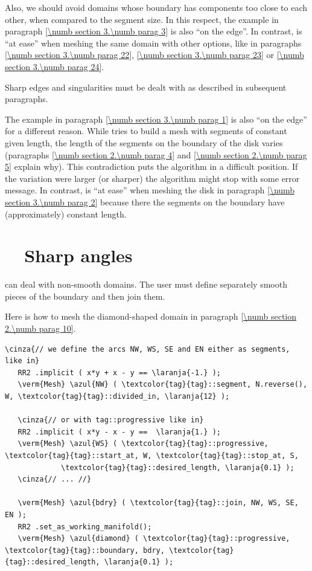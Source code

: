 Also, we should avoid domains whose boundary has components too close to each other,
when compared to the segment size.
In this respect, the example in paragraph \ref{\numb section 3.\numb parag 3} is also
``on the edge''.
In contrast, {\maniFEM} is ``at ease'' when meshing the same domain with other options,
like in paragraphs \ref{\numb section 3.\numb parag 22}, \ref{\numb section 3.\numb parag 23}
or \ref{\numb section 3.\numb parag 24}.

Sharp edges and singularities must be dealt with as described in subsequent paragraphs.

The example in paragraph \ref{\numb section 3.\numb parag 1} is also ``on the edge''
for a different reason.
While {\maniFEM} tries to build a mesh with segments of constant given length,
the length of the segments on the boundary of the disk varies (paragraphs
\ref{\numb section 2.\numb parag 4} and \ref{\numb section 2.\numb parag 5} explain why).
This contradiction puts the algorithm in a difficult position.
If the variation were larger (or sharper) the algorithm might stop with some error message.
In contrast, {\maniFEM} is ``at ease'' when meshing the disk in paragraph
\ref{\numb section 3.\numb parag 2} because there the segments on the boundary have
(approximately) constant length.


\section{~~Sharp angles}\label{\numb section 3.\numb parag 17}

{\ManiFEM} can deal with non-smooth domains.
The user must define separately smooth pieces of the boundary and then join them.

Here is how to mesh the diamond-shaped domain in paragraph \ref{\numb section 2.\numb parag 10}.

\begin{Verbatim}[commandchars=\\\{\},formatcom=\small\tt,frame=single,
   label=parag-\ref{\numb section 3.\numb parag 17}.cpp,rulecolor=\color{coment},
   baselinestretch=0.94,framesep=2mm                                            ]
   \cinza{// we define the arcs NW, WS, SE and EN either as segments, like in}
   RR2 .implicit ( x*y + x - y == \laranja{-1.} );
   \verm{Mesh} \azul{NW} ( \textcolor{tag}{tag}::segment, N.reverse(), W, \textcolor{tag}{tag}::divided_in, \laranja{12} );
   
   \cinza{// or with tag::progressive like in}
   RR2 .implicit ( x*y - x - y ==  \laranja{1.} );
   \verm{Mesh} \azul{WS} ( \textcolor{tag}{tag}::progressive, \textcolor{tag}{tag}::start_at, W, \textcolor{tag}{tag}::stop_at, S,
             \textcolor{tag}{tag}::desired_length, \laranja{0.1} );
   \cinza{// ... //}
             
   \verm{Mesh} \azul{bdry} ( \textcolor{tag}{tag}::join, NW, WS, SE, EN );
   RR2 .set_as_working_manifold();
   \verm{Mesh} \azul{diamond} ( \textcolor{tag}{tag}::progressive, \textcolor{tag}{tag}::boundary, bdry, \textcolor{tag}{tag}::desired_length, \laranja{0.1} );
\end{Verbatim}

